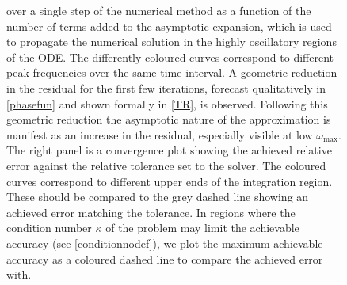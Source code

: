 \documentclass[10pt]{article}
\begin{document}
\begin{figure}[tb]
{    over a single step of the numerical method as a function of the number of
    terms added to the asymptotic expansion, which is used to propagate the
    numerical solution in the highly oscillatory regions of the ODE. The
    differently coloured curves correspond to different peak frequencies over
    the same time interval. A geometric reduction in the residual for the first
    few iterations, forecast qualitatively in \cref{phasefun} and shown formally in
    \cref{TR}, is observed. Following this geometric reduction the
    asymptotic nature of the approximation is manifest as an increase in the
    residual, especially visible at low $\omega_{\text{max}}$. The right panel
    is a convergence plot showing the achieved relative error against the
    relative tolerance set to the solver. The coloured curves correspond to
    different upper ends of the integration region. These should be compared to
    the grey dashed line showing an achieved error matching the tolerance.
    In regions where the condition number $\kappa$ of the problem may limit the achievable
    accuracy (see \cref{conditionnodef}), we plot the maximum achievable
    accuracy as a coloured dashed line to compare the achieved error with. }
\end{figure}
\end{document}
